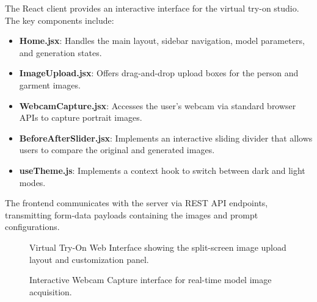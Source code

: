 \documentclass[12pt, a4paper]{report}
\begin{document}
The React client provides an interactive interface for the virtual try-on studio. The key components include:

\begin{itemize}
\item \textbf{Home.jsx}: Handles the main layout, sidebar navigation, model parameters, and generation states.
\item \textbf{ImageUpload.jsx}: Offers drag-and-drop upload boxes for the person and garment images.
\item \textbf{WebcamCapture.jsx}: Accesses the user's webcam via standard browser APIs to capture portrait images.
\item \textbf{BeforeAfterSlider.jsx}: Implements an interactive sliding divider that allows users to compare the original and generated images.
\item \textbf{useTheme.js}: Implements a context hook to switch between dark and light modes.
\end{itemize}

The frontend communicates with the server via REST API endpoints, transmitting form-data payloads containing the images and prompt configurations.

\begin{figure}[htbp]
    \centering
    \caption{Virtual Try-On Web Interface showing the split-screen image upload layout and customization panel.}
    \label{fig:screenshot_frontend}
\end{figure}

\begin{figure}[htbp]
    \centering
    \caption{Interactive Webcam Capture interface for real-time model image acquisition.}
    \label{fig:screenshot_webcam}
\end{figure}
\end{document}
